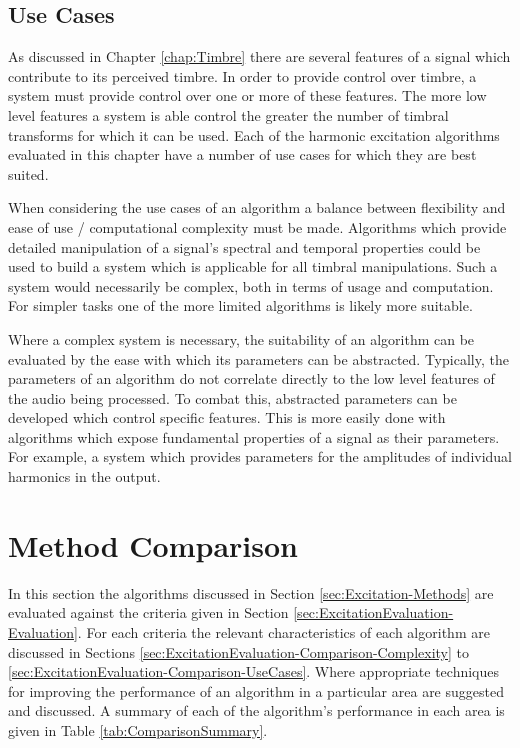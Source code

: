 	\subsection{Use Cases}
	\label{sec:ExcitationEvaluation-Evaluation-UseCases}
		As discussed in Chapter \ref{chap:Timbre} there are several features of a signal which contribute to its
		perceived timbre. In order to provide control over timbre, a system must provide control over one or more
		of these features. The more low level features a system is able control the greater the number of timbral
		transforms for which it can be used. Each of the harmonic excitation algorithms evaluated in this chapter
		have a number of use cases for which they are best suited.
		
		When considering the use cases of an algorithm a balance between flexibility and ease of use /
		computational complexity must be made. Algorithms which provide detailed manipulation of a signal's
		spectral and temporal properties could be used to build a system which is applicable for all timbral
		manipulations. Such a system would necessarily be complex, both in terms of usage and computation. For
		simpler tasks one of the more limited algorithms is likely more suitable.
		
		Where a complex system is necessary, the suitability of an algorithm can be evaluated by the ease with
		which its parameters can be abstracted. Typically, the parameters of an algorithm do not correlate directly
		to the low level features of the audio being processed. To combat this, abstracted parameters can be
		developed which control specific features. This is more easily done with algorithms which expose
		fundamental properties of a signal as their parameters. For example, a system which provides parameters
		for the amplitudes of individual harmonics in the output.

\section{Method Comparison}
\label{sec:ExcitationEvaluation-Comparison}
	In this section the algorithms discussed in Section \ref{sec:Excitation-Methods} are evaluated against the criteria
	given in Section \ref{sec:ExcitationEvaluation-Evaluation}. For each criteria the relevant characteristics of each
	algorithm are discussed in Sections \ref{sec:ExcitationEvaluation-Comparison-Complexity} to
	\ref{sec:ExcitationEvaluation-Comparison-UseCases}. Where appropriate techniques for improving the performance
	of an algorithm in a particular area are suggested and discussed. A summary of each of the algorithm's performance
	in each area is given in Table \ref{tab:ComparisonSummary}.

